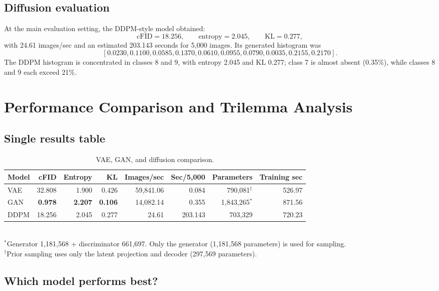 \documentclass[11pt]{article}
\begin{document}
\subsection{Diffusion evaluation}

At the main evaluation setting, the DDPM-style model obtained:
\[
\mathrm{cFID}=18.256,\qquad
\mathrm{entropy}=2.045,\qquad
\mathrm{KL}=0.277,
\]
with 24.61 images/sec and an estimated 203.143 seconds for 5,000 images. Its generated histogram was
\[
[0.0230,0.1100,0.0585,0.1370,0.0610,
0.0955,0.0790,0.0035,0.2155,0.2170].
\]
The DDPM histogram is concentrated in classes 8 and 9, with entropy 2.045 and KL 0.277; class 7 is almost absent (0.35\%), while classes 8 and 9 each exceed 21\%.

\section{Performance Comparison and Trilemma Analysis}

\subsection{Single results table}

\begin{table}[H]\centering
\small
\caption{VAE, GAN, and diffusion comparison.}
\begin{tabular}{lrrrrrrr}
\toprule
Model & cFID & Entropy & KL & Images/sec & Sec/5,000 & Parameters & Training sec\\
\midrule
VAE & 32.808 & 1.900 & 0.426 & 59,841.06 & 0.084 & 790,081$^{\dagger}$ & 526.97\\
GAN & \textbf{0.978} & \textbf{2.207} & \textbf{0.106} & 14,082.14 & 0.355 & 1,843,265$^{*}$ & 871.56\\
DDPM & 18.256 & 2.045 & 0.277 & 24.61 & 203.143 & 703,329 & 720.23\\
\bottomrule
\end{tabular}
\\[2pt]{\footnotesize $^{*}$Generator 1,181,568 + discriminator 661,697. Only the generator (1,181,568 parameters) is used for sampling.}\\
{\footnotesize $^{\dagger}$Prior sampling uses only the latent projection and decoder (297,569 parameters).}
\end{table}

\subsection{Which model performs best?}
\end{document}
